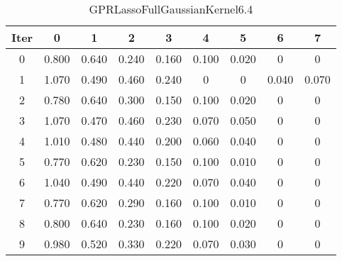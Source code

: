 \begin{table}
	\begin{center}
		\begin{tabular}{|c|c|c|c|c|c|c|c|c|}
			\hline
			Iter & 0 & 1 & 2 & 3 & 4 & 5 & 6 & 7 \\
			\hline
			0 & 0.800 & 0.640 & 0.240 & 0.160 & 0.100 & 0.020 & 0 & 0 \\
			\hline
			1 & 1.070 & 0.490 & 0.460 & 0.240 & 0 & 0 & 0.040 & 0.070 \\
			\hline
			2 & 0.780 & 0.640 & 0.300 & 0.150 & 0.100 & 0.020 & 0 & 0 \\
			\hline
			3 & 1.070 & 0.470 & 0.460 & 0.230 & 0.070 & 0.050 & 0 & 0 \\
			\hline
			4 & 1.010 & 0.480 & 0.440 & 0.200 & 0.060 & 0.040 & 0 & 0 \\
			\hline
			5 & 0.770 & 0.620 & 0.230 & 0.150 & 0.100 & 0.010 & 0 & 0 \\
			\hline
			6 & 1.040 & 0.490 & 0.440 & 0.220 & 0.070 & 0.040 & 0 & 0 \\
			\hline
			7 & 0.770 & 0.620 & 0.290 & 0.160 & 0.100 & 0.010 & 0 & 0 \\
			\hline
			8 & 0.800 & 0.640 & 0.230 & 0.160 & 0.100 & 0.020 & 0 & 0 \\
			\hline
			9 & 0.980 & 0.520 & 0.330 & 0.220 & 0.070 & 0.030 & 0 & 0 \\
			\hline
		\end{tabular}
	\end{center}
	\caption{GPRLassoFullGaussianKernel6.4}
\end{table}